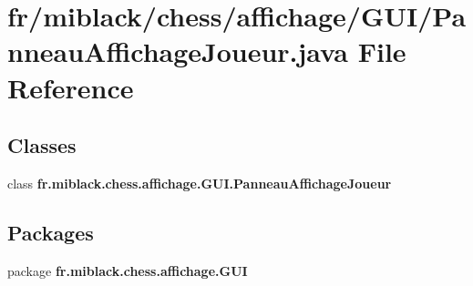 \section{fr/miblack/chess/affichage/\-G\-U\-I/\-Panneau\-Affichage\-Joueur.java File Reference}
\label{PanneauAffichageJoueur_8java}
\subsection*{Classes}
\begin{DoxyCompactItemize}
\item 
class {\bf fr.\-miblack.\-chess.\-affichage.\-G\-U\-I.\-Panneau\-Affichage\-Joueur}
\end{DoxyCompactItemize}
\subsection*{Packages}
\begin{DoxyCompactItemize}
\item 
package {\bf fr.\-miblack.\-chess.\-affichage.\-G\-U\-I}
\end{DoxyCompactItemize}
